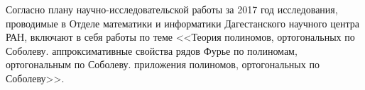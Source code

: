 \Introduction

Согласно плану научно-исследовательской работы за 2017 год исследования, проводимые в Отделе математики и информатики Дагестанского научного центра РАН, включают в себя работы по теме
<<Теория полиномов, ортогональных по Соболеву. аппроксимативные свойства рядов Фурье по полиномам, ортогональным по Соболеву. приложения полиномов, ортогональных по Соболеву>>.








